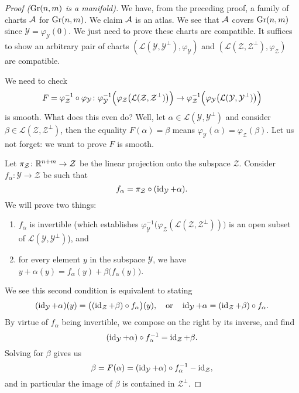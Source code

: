 \begin{proof}[Proof ($\operatorname{Gr}(n,m)$ is a manifold)]
We have, from the preceding proof, a family of charts $\mathcal{A}$ for
$\operatorname{Gr}(n,m)$. We claim $\mathcal{A}$ is an atlas. We see that
$\mathcal{A}$ covers $\operatorname{Gr}(n,m)$ since $\mathcal{Y}=\varphi_{\mathcal{Y}}(0)$.
We just need to prove these charts are compatible. It suffices to show
an arbitrary pair of charts
$(\mathcal{L}(\mathcal{Y},\mathcal{Y}^{\bot}),\varphi_{\mathcal{Y}})$ and
$(\mathcal{L}(\mathcal{Z},\mathcal{Z}^{\bot}),\varphi_{\mathcal{Z}})$
are compatible.

We need to check
\begin{equation}
F=\varphi_{\mathcal{Z}}^{-1}\circ\varphi_{\mathcal{Y}}\colon
\varphi_{\mathcal{Y}}^{-1}\Bigl(\varphi_{\mathcal{Z}}\bigl(\mathcal{L}(\mathcal{Z},\mathcal{Z}^{\bot})\bigr)\Bigr)\to
\varphi_{\mathcal{Z}}^{-1}\Bigl(\varphi_{\mathcal{Y}}\bigl(\mathcal{L}(\mathcal{Y},\mathcal{Y}^{\bot})\bigr)\Bigr)
\end{equation}
is smooth. What does this even do? Well, let $\alpha\in\mathcal{L}(\mathcal{Y},\mathcal{Y}^{\bot})$
and consider $\beta\in\mathcal{L}(\mathcal{Z},\mathcal{Z}^{\bot})$, then
the equality $F(\alpha)=\beta$ means $\varphi_{\mathcal{Y}}(\alpha)=\varphi_{\mathcal{Z}}(\beta)$.
Let us not forget: we want to prove $F$ is smooth.

Let $\pi_{\mathcal{Z}}\colon\mathbb{R}^{n+m}\to\mathcal{Z}$ be the linear
projection onto the subspace $\mathcal{Z}$. Consider $f_{\alpha}\colon\mathcal{Y}\to\mathcal{Z}$
be such that
\begin{equation}
f_{\alpha} = \pi_{\mathcal{Z}}\circ(\operatorname{id}_{\mathcal{Y}} + \alpha).
\end{equation}
We will prove two things:
\begin{enumerate}
\item $f_{\alpha}$ is invertible (which establishes $\varphi^{-1}_{\mathcal{Y}}\bigl(\varphi_{\mathcal{Z}}(\mathcal{L}(\mathcal{Z},\mathcal{Z}^{\bot}))\bigr)$
is an open subset of $\mathcal{L}(\mathcal{Y},\mathcal{Y}^{\bot})$), and
\item for every element $y$ in the subspace $\mathcal{Y}$,
  we have $y+\alpha(y) = f_{\alpha}(y) + \beta\bigl(f_{\alpha}(y)\bigr)$.
\end{enumerate}
We see this second condition is equivalent to stating
\begin{equation}
(\operatorname{id}_{\mathcal{Y}} + \alpha)(y) = \bigl((\operatorname{id}_{\mathcal{Z}} + \beta)\circ f_{\alpha}\bigr)(y),
\quad\mbox{or}\quad \operatorname{id}_{\mathcal{Y}} + \alpha = (\operatorname{id}_{\mathcal{Z}} + \beta)\circ f_{\alpha}.
\end{equation}
By virtue of $f_{\alpha}$ being invertible, we compose on the right by
its inverse, and find
\begin{equation}
(\operatorname{id}_{\mathcal{Y}} + \alpha)\circ f_{\alpha}^{-1} = \operatorname{id}_{\mathcal{Z}} + \beta.
\end{equation}
Solving for $\beta$ gives us
\begin{equation}
\beta = F(\alpha) = (\operatorname{id}_{\mathcal{Y}} + \alpha)\circ f_{\alpha}^{-1} - \operatorname{id}_{\mathcal{Z}},
\end{equation}
and in particular the image of $\beta$ is contained in
$\mathcal{Z}^{\bot}$.


\end{proof}
